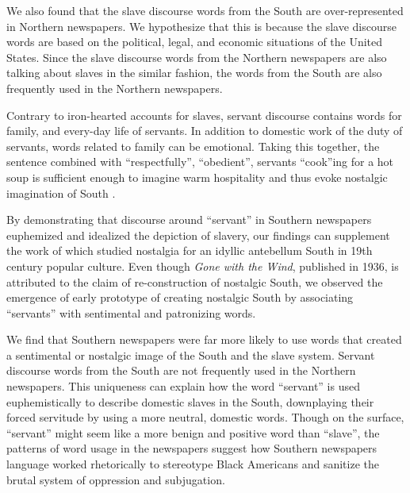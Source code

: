 \documentclass[11pt]{article}
\begin{document}
We also found that the slave discourse words from the South are over-represented in Northern newspapers.
We hypothesize that this is because the slave discourse words are based on the political, legal, and economic situations of the United States. Since the slave discourse words from the Northern newspapers are also talking about slaves in the similar fashion, the words from the South are also frequently used in the Northern newspapers.

Contrary to iron-hearted accounts for slaves, servant discourse contains words for family, and every-day life of servants. 
In addition to domestic work of the duty of servants, words related to family can be emotional. 
Taking this together, the sentence combined with ``respectfully'', ``obedient'', servants ``cook''ing for a hot soup is sufficient enough to imagine warm hospitality and thus evoke nostalgic imagination of South \citep{mcpherson_reconstructing_2003}. 

By demonstrating that discourse around ``servant'' in Southern newspapers euphemized and idealized the depiction of slavery, our findings can supplement the work of \citet{glazer_carry_1996} which studied nostalgia for an idyllic antebellum South in 19th century popular culture.
Even though \textit{Gone with the Wind}, published in 1936, is attributed to the claim of re-construction of nostalgic South, we observed the emergence of early prototype of creating nostalgic South by associating ``servants'' with sentimental and patronizing words. 

We find that Southern newspapers were far more likely to use words that created a sentimental or nostalgic image of the South and the slave system.
Servant discourse words from the South are not frequently used in the Northern newspapers. This uniqueness can explain how the word ``servant'' is used euphemistically to describe domestic slaves in the South, downplaying their forced servitude by using a more neutral, domestic words. 
Though on the surface, ``servant'' might seem like a more benign and positive word than ``slave'', the patterns of word usage in the newspapers suggest how Southern newspapers language worked rhetorically to stereotype Black Americans and sanitize the brutal system of oppression and subjugation.

\end{document}
